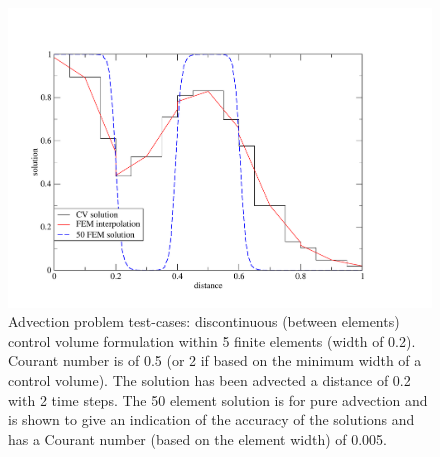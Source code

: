 \begin{figure}[h]
\begin{center}
\includegraphics[width=1.2\textwidth]{diagrams/compar-dg-bdt-diff}
\end{center}
\caption{Advection problem test-cases: discontinuous (between
  elements) control volume formulation within 5 finite elements (width
  of 0.2). Courant number is of 0.5 (or 2 if based on the minimum
  width of a control volume). The solution has been advected a
  distance of 0.2 with 2 time steps. The 50 element solution is for
  pure advection and is shown to give an indication of the accuracy of
  the solutions and has a Courant number (based on the element width)
  of 0.005.\label{compar-dg-bdt-diff}}
\end{figure}


